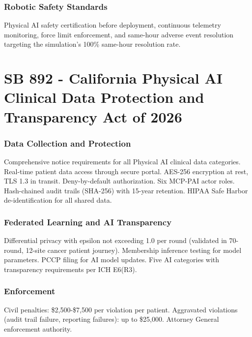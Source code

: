 \documentclass[11pt,letterpaper]{article}
\begin{document}
\section{Robotic Safety Standards}

Physical AI safety certification before deployment, continuous telemetry
monitoring, force limit enforcement, and same-hour adverse event resolution
targeting the simulation's 100\% same-hour resolution rate.

\newpage


\part{SB 892 - California Physical AI Clinical Data Protection
and Transparency Act of 2026}

\section{Data Collection and Protection}

Comprehensive notice requirements for all Physical AI clinical data categories.
Real-time patient data access through secure portal. AES-256 encryption at
rest, TLS 1.3 in transit. Deny-by-default authorization. Six MCP-PAI actor
roles. Hash-chained audit trails (SHA-256) with 15-year retention. HIPAA Safe
Harbor de-identification for all shared data.

\section{Federated Learning and AI Transparency}

Differential privacy with epsilon not exceeding 1.0 per round (validated in
70-round, 12-site cancer patient journey). Membership inference testing for
model parameters. PCCP filing for AI model updates. Five AI categories with
transparency requirements per ICH E6(R3).

\section{Enforcement}

Civil penalties: \$2,500-\$7,500 per violation per patient. Aggravated
violations (audit trail failure, reporting failures): up to \$25,000.
Attorney General enforcement authority.
\end{document}
